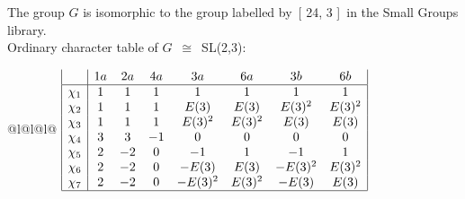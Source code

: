 \documentclass[varwidth=\maxdimen,border=10]{standalone}
\begin{document}
The group $G$ is isomorphic to the group labelled by\ [ 24, 3 ]\ in the Small Groups library.\\
Ordinary character table of $G$\ $\cong$\ SL(2,3):\\
\begin{center}
\begin{tabular}{@{}l@{}l@{}l@{}}
\hline
\(\begin{array}{|l|ccccccc|}
  & 1a & 2a & 4a & 3a & 6a & 3b & 6b\\ \hline
\chi_{1} & 1 & 1 & 1 & 1 & 1 & 1 & 1\\
\chi_{2} & 1 & 1 & 1 & E(3) & E(3) & E(3)^{2} & E(3)^{2}\\
\chi_{3} & 1 & 1 & 1 & E(3)^{2} & E(3)^{2} & E(3) & E(3)\\
\chi_{4} & 3 & 3 & -1 & 0 & 0 & 0 & 0\\
\chi_{5} & 2 & -2 & 0 & -1 & 1 & -1 & 1\\
\chi_{6} & 2 & -2 & 0 & -E(3) & E(3) & -E(3)^{2} & E(3)^{2}\\
\chi_{7} & 2 & -2 & 0 & -E(3)^{2} & E(3)^{2} & -E(3) & E(3)\\
\hline
\end{array}\)\\
\end{tabular}
\end{center}
\end{document}

